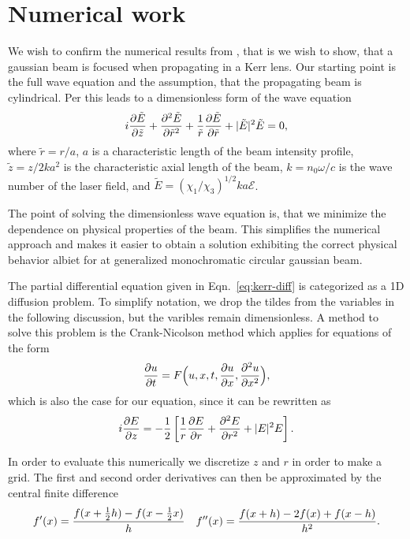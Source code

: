 \section{Numerical work}

We wish to confirm the numerical results from
\textcite{prl-selffocus}, that is we wish to show, that a gaussian
beam is focused when propagating in a Kerr lens. Our starting point is
the full wave equation and the assumption, that the propagating beam
is cylindrical. Per \textcite{prl-selffocus} this leads to a
dimensionless form of the wave equation
\begin{align}
  \label{eq:kerr-diff}
   i \frac{\partial \tilde E}{\partial \tilde z} + \frac{\partial^2 \tilde E}{\partial \tilde r^2}
   + \frac{1}{\tilde r} \frac{\partial \tilde E}{\partial \tilde r}
   + |\tilde E|^2 \tilde E
   = 0,
\end{align}
where $\tilde r = r/a$, $a$ is a characteristic length of the beam
intensity profile, $\tilde z = z / 2ka^2$ is the characteristic axial
length of the beam, $k = n_0 \omega / c$ is the wave number of the
laser field, and $\tilde E = (\chi_1/\chi_3)^{1/2} k a
\mathcal{E}$.

The point of solving the dimensionless wave equation is, that we
minimize the dependence on physical properties of the beam. This
simplifies the numerical approach and makes it easier to obtain a
solution exhibiting the correct physical behavior albiet for at
generalized monochromatic circular gaussian beam.

The partial differential equation given in Eqn.~\eqref{eq:kerr-diff}
is categorized as a 1D diffusion problem. To simplify notation, we
drop the tildes from the variables in the following discussion, but
the varibles remain dimensionless. A method to solve this problem is
the Crank-Nicolson method which applies for equations of the form
\begin{equation}
  \label{eq:Crank-Nicolson}
  \frac{\partial u}{\partial t} = F \Big(u, x, t, \frac{\partial u}{\partial x}, \frac{\partial^2 u}{\partial x^2} \Big), 
\end{equation}
which is also the case for our equation, since it can be rewritten as
\begin{equation}
  \label{eq:kerr-diff-crank}
  i\frac{\partial E}{\partial z} = -\frac{1}{2} \left[\frac{1}{r} \frac{\partial E}{\partial r} + \frac{\partial^2 E}{\partial r^2} + |E|^{2} E \right]. 
\end{equation}

In order to evaluate this numerically we discretize $z$ and $r$ in order to make a grid. The first
and second order derivatives can then be approximated by the central finite difference
\begin{equation}
  \label{eq:central-diff}
  f'(x) = \frac{f(x+\frac{1}{2} h) - f(x - \frac{1}{2} x)}{h} \quad f''(x) = \frac{f(x+h) - 2f(x) + f(x-h)}{h^{2}}.
\end{equation}


